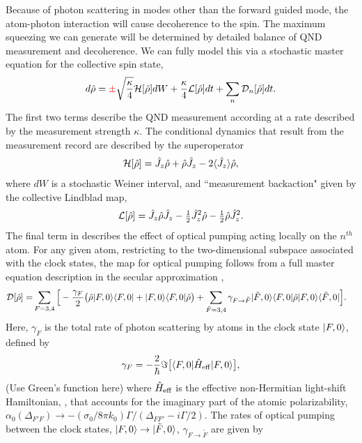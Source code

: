 \documentclass[preprint,aps,pra,onecolumn]{revtex4-1} %
\newcommand{\charpol}{\alpha_0(\Delta_{F'F})}
\newcommand{\comment}[1]{{\color{Maroon} #1}}
\newcommand{\error}[1]{{\color{red} #1}}
\begin{document}
Because of photon scattering in modes other than the forward guided mode, the atom-photon interaction will cause decoherence to the spin.  The maximum squeezing we can generate will be determined by detailed balance of QND measurement and decoherence.  We can fully model this via a stochastic master equation for the collective spin state,
	\begin{align} \label{Eq::SME}
		d \hat{\rho} = \error{\pm}\sqrt{\frac{\kappa}{4}} \mathcal{H}[\hat{\rho}] dW + \frac{\kappa}{4} \mathcal{L}[\hat{\rho}] dt + \sum_n \mathcal{D}_n [\hat{\rho}] dt.
	\end{align}
The first two terms describe the QND measurement according at a rate described by the measurement strength $\kappa$. The conditional dynamics that result from the measurement record are described by the superoperator
	\begin{align}
		\mathcal{H}[\hat{\rho}] = \hat{J}_z \hat{\rho} + \hat{\rho} \hat{J}_z - 2 \langle{\hat{J}_z}\rangle \hat{\rho},
	\end{align}
where $dW$ is a stochastic Weiner interval, and ``measurement backaction" given by the collective Lindblad map, 
	\begin{align}
		\mathcal{L}[\hat{\rho}] = \hat{J}_z \hat{\rho} \hat{J}_z - \mbox{$\frac{1}{2}$} \hat{J}_z^2 \hat{\rho} - \mbox{$\frac{1}{2}$} \hat{\rho}  \hat{J}_z^2 .
	\end{align}
The final term in  describes the effect of optical pumping acting locally on the $n^{th}$ atom.  For any given atom, restricting to the two-dimensional subspace associated with the clock states, the map for optical pumping follows from a full master equation description in the secular approximation \cite{deutsch_quantum_2010},
	\begin{align}
		\mathcal{D}[\hat{\rho}] =  &\sum_{F=3,4} \Big[ -\frac{\gamma_{F}}{2} \big( \hat{\rho} \lvert{F,0}\rangle\langle{F,0}\rvert + \lvert{F,0}\rangle\langle{F,0}\rvert \hat{\rho} \big)
		+  \sum_{\tilde{F} =3,4}  \gamma_{F \rightarrow \tilde{F}} \lvert{\tilde{F},0}\rangle\langle{F,0}\rvert \hat{\rho} \lvert{F,0}\rangle\langle{\tilde{F},0}\rvert \Big].
	\end{align}
Here, $\gamma_{F}$ is the total rate of photon scattering by atoms in the clock state $\lvert{F,0}\rangle$, defined by
	\begin{equation}
		\gamma_{F}=- \frac{2}{\hbar} \Im \big[ \langle{F,0}\rvert \hat{H}_{\rm eff}\lvert{F,0}\rangle \big] ,
	\end{equation}
\comment{(Use Green's function here)} where $\hat{H}_{\text{eff}}$ is the effective non-Hermitian light-shift Hamiltonian, , that accounts for the imaginary part of the atomic polarizability, $\charpol \rightarrow -(\sigma_0/8\pi k_0) \Gamma/(\Delta_{FF'}-i\Gamma/2)$.   The rates of optical pumping between the clock states,  $\lvert{F,0}\rangle \rightarrow \lvert{\tilde{F},0}\rangle$, $\gamma_{F \rightarrow \tilde{F} }$ are given by
\end{document}
